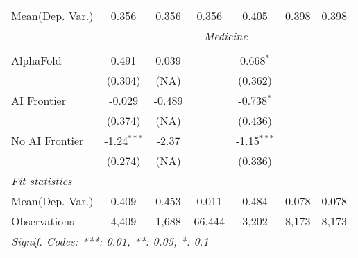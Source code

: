 \begin{tabular}{lcccccc}
Mean(Dep. Var.) & 0.356 & 0.356 & 0.356 & 0.405 & 0.398 & 0.398 \\
 & \multicolumn{6}{c}{\textit{Medicine}} \\ \\
   AlphaFold      & 0.491         & 0.039     &        & 0.668$^{*}$   &       &   \\   
                  & (0.304)       & (NA)      &        & (0.362)       &       &   \\   
   AI Frontier    & -0.029        & -0.489    &        & -0.738$^{*}$  &       &   \\   
                  & (0.374)       & (NA)      &        & (0.436)       &       &   \\   
   No AI Frontier & -1.24$^{***}$ & -2.37     &        & -1.15$^{***}$ &       &   \\   
                  & (0.274)       & (NA)      &        & (0.336)       &       &   \\   
   \midrule
   \emph{Fit statistics}\\
Mean(Dep. Var.) & 0.409 & 0.453 & 0.011 & 0.484 & 0.078 & 0.078 \\
   Observations   & 4,409         & 1,688     & 66,444 & 3,202         & 8,173 & 8,173\\  
   \midrule \midrule
   \multicolumn{7}{l}{\emph{Signif. Codes: ***: 0.01, **: 0.05, *: 0.1}}\\
\end{tabular}
\par\endgroup
